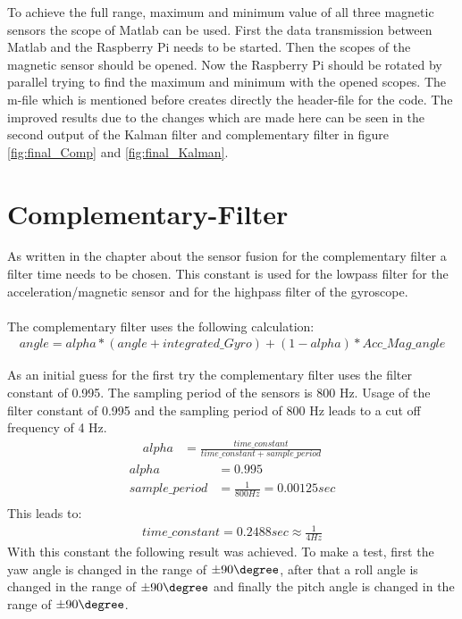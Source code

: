 To achieve the full range, maximum and minimum value of all three magnetic sensors the scope of Matlab can be used. First the data transmission between Matlab and the Raspberry Pi needs to be started. Then the scopes of the magnetic sensor should be opened. Now the Raspberry Pi should be rotated by parallel trying to find the maximum and minimum with the opened scopes. The m-file which is mentioned before creates directly the header-file for the code. The improved results due to the changes which are made here can be seen in the second output of the Kalman filter and complementary filter in figure \ref{fig:final_Comp} and \ref{fig:final_Kalman}.



\section{Complementary-Filter}
\label{sec:ComplementaryFilterResult}

As written in the chapter about the sensor fusion for the complementary filter a filter time needs to be chosen. This constant is used for the lowpass filter for the acceleration/magnetic sensor and for the highpass filter of the gyroscope. \\\\
The complementary filter uses the following calculation:
\begin{align}
angle=alpha*(angle+integrated\_Gyro)+(1-alpha)*Acc\_Mag\_angle
\label{equ:Comp1}
\end{align}

As an initial guess for the first try the complementary filter uses the filter constant of 0.995. The sampling period of the sensors is 800 Hz. Usage of the filter constant of 0.995 and the sampling period of 800 Hz leads to a cut off frequency of 4 Hz. 
\begin{align}
alpha&=\frac{time\_constant}{time\_constant+sample\_period}
\label{equ:Comp2a}
\end{align}
\begin{align}
alpha&=0.995\\
sample\_period&=\frac{1}{800 Hz}=0.00125sec\\
\label{equ:Comp2b}
\end{align}
This leads to:
\begin{align}
time\_constant = 0.2488sec\approx \frac{1}{4 Hz}
\label{equ:Comp3}
\end{align}
With this constant the following result was achieved. To make a test, first the yaw angle is changed in the range of $\pm90 \degree$, after that a roll angle is changed in the range of $\pm90 \degree$ and finally the pitch angle is changed in the range of $\pm90 \degree$.

